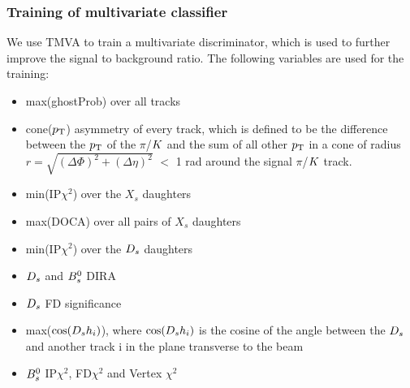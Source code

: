 \subsubsection{Training of multivariate classifier}

We use TMVA \cite{Hocker:2007ht} to train a multivariate discriminator, which is used to further improve the signal to background ratio. 
The following variables are used for the training:

\begin{itemize} 

\item max(ghostProb) over all tracks

\item cone($\mbox{$p_{\mathrm{ T}}$}$) asymmetry of every track, 
which is defined to be the difference between the $\mbox{$p_{\mathrm{ T}}$}$ of the $\pi$/${K}$ and the sum of all other $\mbox{$p_{\mathrm{ T}}$}$ in a cone of radius $r = \sqrt{(\Delta\Phi)^{2} + (\Delta\eta)^{2}}$ $<$ 1 rad around the signal $\pi$/${K}$ track.

\item min(IP$\chi^{2}$) over the $X_{s}$ daughters

\item max(DOCA) over all pairs of $X_{s}$ daughters

\item min(IP$\chi^{2}$) over the ${{D}_{s}}$ daughters

\item ${{D}_{s}}$ and ${{B}^0_{s}}$ DIRA

\item ${{D}_{s}}$ FD significance

\item max($\cos({{D}_{s}} h_{i})$), where $\cos({{D}_{s}} h_{i})$ is the cosine of the angle between the ${{D}_{s}}$ and another track i in the plane transverse to the beam

\item ${{B}^0_{s}}$ IP$\chi^{2}$, FD$\chi^{2}$ and Vertex $\chi^{2}$

\end{itemize}

